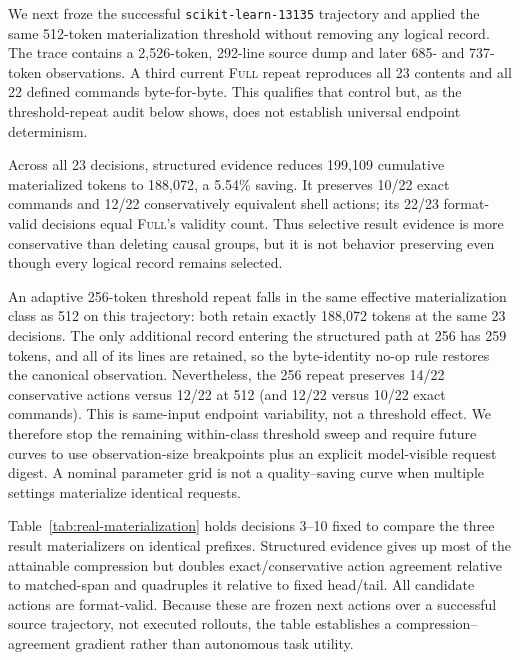 \documentclass[11pt]{article}
\begin{document}
We next froze the successful \texttt{scikit-learn-13135} trajectory and applied
the same 512-token materialization threshold without removing any logical
record.  The trace contains a 2,526-token, 292-line source dump and later 685-
and 737-token observations.  A third current \textsc{Full} repeat reproduces
all 23 contents and all 22 defined commands byte-for-byte. This qualifies that
control but, as the threshold-repeat audit below shows, does not establish
universal endpoint determinism.

Across all 23 decisions, structured evidence reduces 199,109 cumulative
materialized tokens to 188,072, a 5.54\% saving.  It preserves 10/22 exact
commands and 12/22 conservatively equivalent shell actions; its 22/23
format-valid decisions equal \textsc{Full}'s validity count.  Thus selective
result evidence is more conservative than deleting causal groups, but it is
not behavior preserving even though every logical record remains selected.

An adaptive 256-token threshold repeat falls in the same effective
materialization class as 512 on this trajectory: both retain exactly 188,072
tokens at the same 23 decisions. The only additional record entering the
structured path at 256 has 259 tokens, and all of its lines are retained, so
the byte-identity no-op rule restores the canonical observation. Nevertheless,
the 256 repeat preserves 14/22 conservative actions versus 12/22 at 512 (and
12/22 versus 10/22 exact commands). This is same-input endpoint variability,
not a threshold effect. We therefore stop the remaining within-class threshold
sweep and require future curves to use observation-size breakpoints plus an
explicit model-visible request digest. A nominal parameter grid is not a
quality--saving curve when multiple settings materialize identical requests.

Table~\ref{tab:real-materialization} holds decisions 3--10 fixed to compare the
three result materializers on identical prefixes.  Structured evidence gives
up most of the attainable compression but doubles exact/conservative action
agreement relative to matched-span and quadruples it relative to fixed
head/tail.  All candidate actions are format-valid.  Because these are frozen
next actions over a successful source trajectory, not executed rollouts, the
table establishes a compression--agreement gradient rather than autonomous
task utility.
\end{document}
